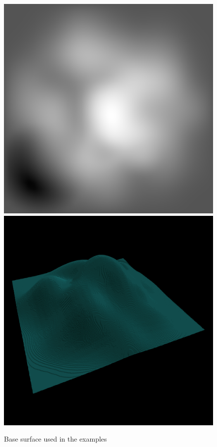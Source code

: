 	\begin{figure}[H]
		\centering
		\includegraphics[width=\imagewidth]{images/results/terrains/512-1/orig}
		\includegraphics[width=\imagewidth]{images/results/terrains/512-1/orig_3d}
		\caption{Base surface used in the examples}
		\label{fig:ex-base-surface}
	\end{figure}
  
